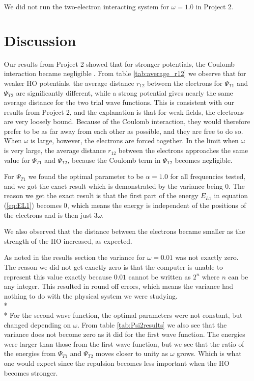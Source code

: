 \documentclass[norsk,a4paper,12pt]{article}
\begin{document}
We did not run the two-electron interacting system for $\omega = 1.0$ in Project 2.

\section{Discussion} \label{Discussion}
Our results from Project 2 showed that for stronger potentials, the Coulomb interaction became negligible \cite{Project_2}. From table \ref{tab:average_r12} we observe that for weaker HO potentials, the average distance $r_{12}$ between the electrons for $\Psi_{T1}$ and $\Psi_{T2}$ are significantly different, while a strong potential gives nearly the same average distance for the two trial wave functions. This is consistent with our results from Project 2, and the explanation is that for weak fields, the electrons are very loosely bound. Because of the Coulomb interaction, they would therefore prefer to be as far away from each other as possible, and they are free to do so. When $\omega$ is large, however, the electrons are forced together. In the limit when $\omega$ is very large, the average distance $r_{12}$ between the electrons approaches the same value for $\Psi_{T1}$ and $\Psi_{T2}$, because the Coulomb term in $\Psi_{T2}$ becomes negligible.\par 
\vspace{3mm}

For $\Psi_{T1}$ we found the optimal parameter to be $\alpha=1.0$ for all frequencies tested, and we got the exact result which is demonstrated by the variance being $0$. The reason we get the exact result is that the first part of the energy $E_{L1}$ in equation (\ref{eq:EL1}) becomes $0$, which means the energy is independent of the positions of the electrons and is then just $3\omega$. 

We also observed that the distance between the electrons became smaller as the strength of the HO increased, as expected.

As noted in the results section the variance for $\omega=0.01$ was not exactly zero. The reason we did not get exactly zero is that the computer is unable to represent this value exactly because $0.01$ cannot be written as $2^{n}$ where $n$ can be any integer. This resulted in round off errors, which means the variance had nothing to do with the physical system we were studying.
\\* \\* \noindent
For the second wave function, the optimal parameters were not constant, but changed depending on $\omega$. From table \ref{tab:Psi2results} we also see that the variance does not become zero as it did for the first wave function. The energies were larger than those from the first wave function, but we see that the ratio of the energies from $\Psi_{T1}$ and $\Psi_{T2}$ moves closer to unity as $\omega$ grows. Which is what one would expect since the repulsion becomes less important when the HO becomes stronger.
\end{document}
